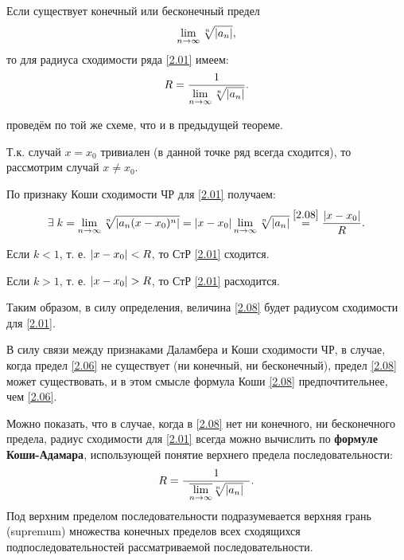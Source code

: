 \begin{col-answer-preambule}
\end{col-answer-preambule}

\begin{theorem}
	Если существует конечный или бесконечный предел
	\begin{equation}
	\label{2.07}
	\lim\limits_{n\to\infty} \sqrt[n]{\left\lvert a_n \right\rvert},
	\end{equation}
	то для радиуса сходимости ряда \eqref{2.01} имеем:
	\begin{equation}
	\label{2.08}
	R = \dfrac{1}{\lim\limits_{n\to\infty} \sqrt[n]{\left\lvert a_n \right\rvert}}.
	\end{equation}
\end{theorem}
\begin{proofUndotted} проведём по той же схеме, что и в предыдущей теореме.
	
	Т.к. случай $ x=x_0 $ тривиален (в данной точке ряд всегда сходится), то рассмотрим случай $ x \ne x_0 $.
	
	По признаку Коши сходимости ЧР для \eqref{2.01} получаем:
	\begin{equation*}
	\exists \; k = \lim\limits_{n\to\infty} \sqrt[n]{\left\lvert a_n (x-x_0)^n \right\rvert} =
	\left\lvert x-x_0 \right\rvert \lim\limits_{n\to\infty} \sqrt[n]{\left\lvert a_n \right\rvert} \overset{\eqref{2.08}}{=} \dfrac{\left\lvert x-x_0 \right\rvert}{R}.
	\end{equation*}
	
	Если $ k < 1 $, т. е. $ \left\lvert x - x_0 \right\rvert < R $, то СтР \eqref{2.01} сходится.
	
	Если $ k > 1 $, т. е. $ \left\lvert x - x_0 \right\rvert > R $, то СтР \eqref{2.01} расходится.
	
	
	Таким образом, в силу определения, величина \eqref{2.08} будет радиусом сходимости для \eqref{2.01}.
\end{proofUndotted}

\begin{notes}
	\item В силу связи между признаками Даламбера и Коши сходимости ЧР, в случае, когда предел \eqref{2.06} не существует (ни конечный, ни бесконечный),
	предел \eqref{2.08} может существовать, и в этом смысле формула Коши \eqref{2.08} предпочтительнее, чем \eqref{2.06}.
	
	\item Можно показать, что в случае, когда в \eqref{2.08} нет ни конечного, ни бесконечного предела, радиус сходимости для \eqref{2.01} всегда можно вычислить по
	\textbf{формуле Коши-Адамара}, использующей понятие верхнего предела последовательности:
	\begin{equation}
	\label{2.09}
	R = \dfrac{1}{\;\; \overline{\lim\limits_{n\to\infty}} \sqrt[n]{\left\lvert a_n \right\rvert} \;\;}.
	\end{equation}
	Под верхним пределом последовательности подразумевается верхняя грань (supremum) множества конечных пределов всех сходящихся подпоследовательностей рассматриваемой последовательности.
\end{notes}